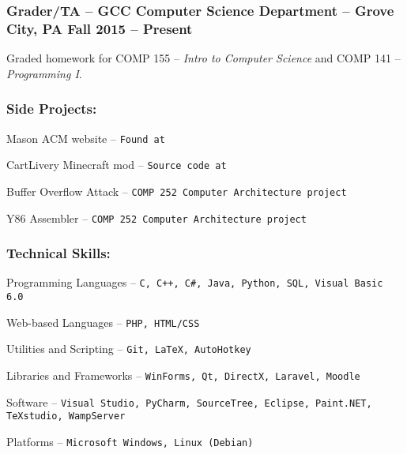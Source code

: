\documentclass[12pt]{article}
\begin{document}
\subsubsection*{\textnormal{{\color{accent} Grader/TA }\color{head} -- GCC Computer Science Department -- Grove City, PA	\hfill Fall 2015 -- Present}}
\vspace{-2mm}
\begin{compactitem}
	\item Graded homework for COMP 155 -- \textit{Intro to Computer Science} and COMP 141 -- \textit{Programming I}.
\end{compactitem}

\subsubsection*{\color{head}Side Projects:}
\begin{compactitem}
	\item {\color{accent} Mason ACM website} -- \texttt{Found at \underline{}}
	\item {\color{accent} CartLivery Minecraft mod} -- \texttt{Source code at \underline{}}
	\item {\color{accent} Buffer Overflow Attack} -- \texttt{COMP 252 Computer Architecture project}
	\item {\color{accent} Y86 Assembler} -- \texttt{COMP 252 Computer Architecture project}
\end{compactitem}

\subsubsection*{\color{head}Technical Skills:}
\begin{compactitem}
	\item {\color{accent} Programming Languages} -- \texttt{C, C++, C\#, Java, Python, SQL, Visual Basic 6.0}
	\item {\color{accent} Web-based Languages} -- \texttt{PHP, HTML/CSS}
	\item {\color{accent} Utilities and Scripting} -- \texttt{Git, LaTeX, AutoHotkey}
	\item {\color{accent} Libraries and Frameworks} -- \texttt{WinForms, Qt, DirectX, Laravel, Moodle}
	\item {\color{accent} Software} -- \texttt{Visual Studio, PyCharm, SourceTree, Eclipse, Paint.NET, TeXstudio, WampServer}
	\item {\color{accent} Platforms} -- \texttt{Microsoft Windows, Linux (Debian)}
\end{compactitem}
\end{document}
